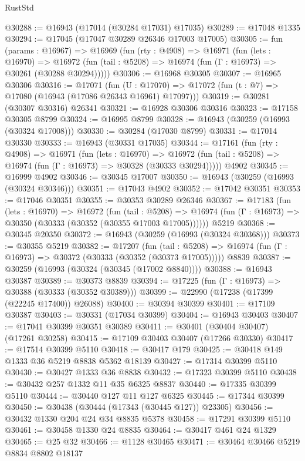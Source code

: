 \begin{lexlean}{RustStd}
\begin{coremodule}
@30288 := @16943 (@17014 (@30284 @17031) @17035)
@30289 := @17048 @1335
@30294 := @17045 (@17047 @30289 @26346 @17003 @17005)
@30305 := fun (params : @16967) =>
  @16969
    (fun (rty : @4908) =>
    @16971
      (fun (lets : @16970) =>
      @16972 (fun (tail : @5208) => @16974 (fun (Γ : @16973) => @30261 (@30288 @30294)))))
@30306 := @16968 @30305
@30307 := @16965 @30306
@30316 := @17071
    (fun (U : @17070) => @17072 (fun (t : @7) => @17080 (@16943 (@17086 @26343 @16961) @17097)))
@30319 := @30281 (@30307 @30316) @26341
@30321 := @16928 @30306 @30316
@30323 := @17158 @30305 @8799
@30324 := @16995 @8799
@30328 := @16943 (@30259 (@16993 (@30324 @17008)))
@30330 := @30284 (@17030 @8799)
@30331 := @17014 @30330
@30333 := @16943 (@30331 @17035)
@30344 := @17161
    (fun (rty : @4908) =>
    @16971
      (fun (lets : @16970) =>
      @16972 (fun (tail : @5208) => @16974 (fun (Γ : @16973) => @30328 (@30333 @30294)))))
    @4902
@30345 := @16999 @4902
@30346 := @30345 @17007
@30350 := @16943 (@30259 (@16993 (@30324 @30346)))
@30351 := @17043 @4902
@30352 := @17042 @30351
@30353 := @17046 @30351
@30355 := @30353 @30289 @26346
@30367 := @17183
    (fun (lets : @16970) =>
    @16972
      (fun (tail : @5208) =>
      @16974 (fun (Γ : @16973) => @30350 (@30333 (@30352 (@30355 @17003 @17005))))))
    @5219
@30368 := @30345 @20350
@30372 := @16943 (@30259 (@16993 (@30324 @30368)))
@30373 := @30355 @5219
@30382 := @17207
    (fun (tail : @5208) => @16974 (fun (Γ : @16973) => @30372 (@30333 (@30352 (@30373 @17005)))))
    @8839
@30387 := @30259 (@16993 (@30324 (@30345 (@17002 @8840))))
@30388 := @16943 @30387
@30389 := @30373 @8839
@30394 := @17225 (fun (Γ : @16973) => @30388 (@30333 (@30352 @30389)))
@30399 := @22990 (@17238 (@17399 (@22245 @17400)) @26088)
@30400 := @30394 @30399
@30401 := @17109 @30387
@30403 := @30331 (@17034 @30399)
@30404 := @16943 @30403
@30407 := @17041 @30399 @30351 @30389
@30411 := @30401 (@30404 @30407) (@17261 @30258)
@30415 := @17109 @30403 @30407 (@17266 @30330)
@30417 := @17514 @30399 @5110
@30418 := @30417 @179
@30425 := @30418 @149 @1333 @36 @5219 @8838 @5362 @18139
@30427 := @17314 @30399 @5110
@30430 := @30427 @1333 @36 @8838
@30432 := @17323 @30399 @5110
@30438 := @30432 @257 @1332 @11 @35 @6325 @8837
@30440 := @17335 @30399 @5110
@30444 := @30440 @127 @11 @127 @6325
@30445 := @17344 @30399
@30450 := @30438 (@30444 (@17343 (@30445 @127)) @23305)
@30456 := @30432 @1330 @204 @24 @34 @8835 @5378
@30458 := @17291 @30399 @5110
@30461 := @30458 @1330 @24 @8835
@30464 := @30417 @461 @24 @1329
@30465 := @25 @32
@30466 := @1128 @30465
@30471 := @30464 @30466 @5219 @8834 @8802 @18137

\end{coremodule}
\end{lexlean}
